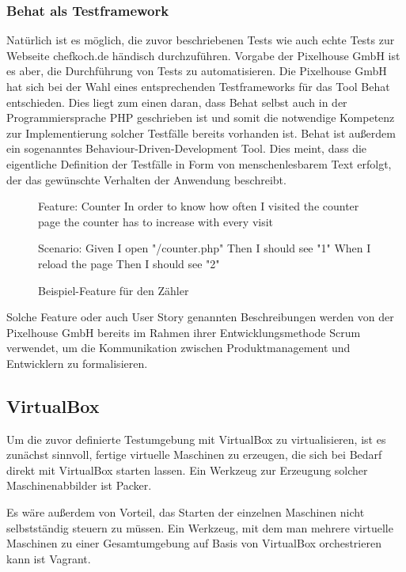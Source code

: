 \subsubsection{Behat als Testframework}

Natürlich ist es möglich, die zuvor beschriebenen Tests wie auch echte Tests zur Webseite chefkoch.de händisch durchzuführen. Vorgabe der Pixelhouse GmbH ist es aber, die Durchführung von Tests zu automatisieren. Die Pixelhouse GmbH hat sich bei der Wahl eines entsprechenden Testframeworks für das Tool Behat entschieden. Dies liegt zum einen daran, dass Behat selbst auch in der Programmiersprache PHP geschrieben ist und somit die notwendige Kompetenz zur Implementierung solcher Testfälle bereits vorhanden ist. Behat ist außerdem ein sogenanntes Behaviour-Driven-Development Tool. Dies meint, dass die eigentliche Definition der Testfälle in Form von menschenlesbarem Text erfolgt, der das gewünschte Verhalten der Anwendung beschreibt.

\begin{figure}[!ht]
  \begin{center}
    \begin{gherkincode}
Feature: Counter
  In order to know how often I visited the counter page
  the counter has to increase with every visit

  Scenario:
    Given I open "/counter.php"
    Then I should see "1"
    When I reload the page
    Then I should see "2"

    \end{gherkincode}
    \caption{Beispiel-Feature für den Zähler}
  \end{center}
\end{figure}

Solche Feature oder auch User Story genannten Beschreibungen werden von der Pixelhouse GmbH bereits im Rahmen ihrer Entwicklungsmethode Scrum verwendet, um die Kommunikation zwischen Produktmanagement und Entwicklern zu formalisieren.

\subsection{VirtualBox}

Um die zuvor definierte Testumgebung mit VirtualBox zu virtualisieren, ist es zunächst sinnvoll, fertige virtuelle Maschinen zu erzeugen, die sich bei Bedarf direkt mit VirtualBox starten lassen. Ein Werkzeug zur Erzeugung solcher Maschinenabbilder ist Packer.

Es wäre außerdem von Vorteil, das Starten der einzelnen Maschinen nicht selbstständig steuern zu müssen. Ein Werkzeug, mit dem man mehrere virtuelle Maschinen zu einer Gesamtumgebung auf Basis von VirtualBox orchestrieren kann ist Vagrant.

